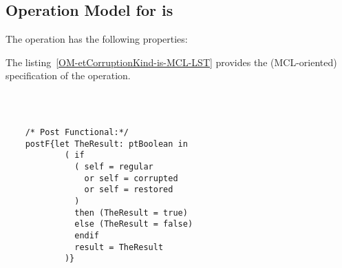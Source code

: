 \subsection{Operation Model for is}

\label{OM-is}


The  operation has the following properties:

	\begin{operationmodel}



		


	\end{operationmodel}



	\vspace{1cm}
	The listing~\ref{OM-etCorruptionKind-is-MCL-LST} provides the \msrmessir (MCL-oriented) specification of the operation.
	
	\scriptsize
	\vspace{0.5cm}
	\begin{lstlisting}[style=MessirStyle,firstnumber=auto,captionpos=b,caption={\msrmessir (MCL-oriented) specification of the operation \emph{is}.},label=OM-etCorruptionKind-is-MCL-LST]

	
	
	/* Post Functional:*/ 
	postF{let TheResult: ptBoolean in
	        ( if
	          ( self = regular
	            or self = corrupted
	            or self = restored
	          )
	          then (TheResult = true)
	          else (TheResult = false)
	          endif
	          result = TheResult
	        )}
	
	
	\end{lstlisting}
	\normalsize 
	
	
	
	





